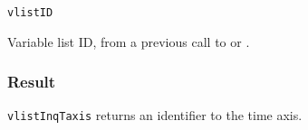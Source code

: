 \hspace*{4mm}\begin{minipage}[]{15cm}
\begin{deflist}{\tt vlistID\ }
\item[{\tt vlistID}]
Variable list ID, from a previous call to {} or {}.

\end{deflist}
\end{minipage}

\subsubsection*{Result}

{\tt vlistInqTaxis} returns an identifier to the time axis.

